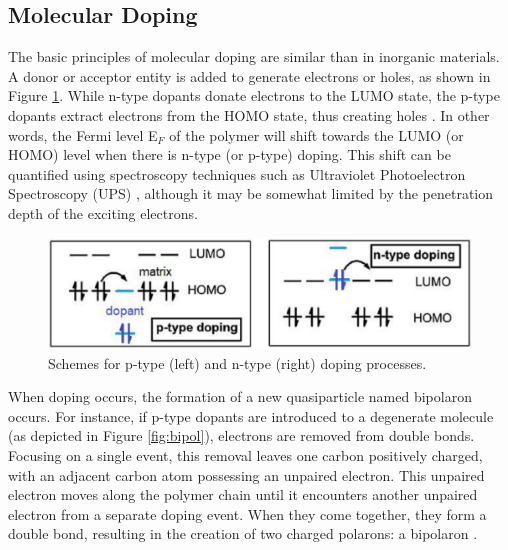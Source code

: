 
\subsection{Molecular Doping} \label{subsec:moldop}
The basic principles of molecular doping are similar than in inorganic materials. A donor or acceptor entity is added to generate electrons or holes, as shown in Figure \ref{fig:dopscheme}. While n-type dopants donate electrons to the LUMO state, the p-type dopants extract electrons from the HOMO state, thus creating holes \cite{lussemDopingOrganicSemiconductors2013}. In other words, the Fermi level E$_{F}$ of the polymer will shift towards the LUMO (or HOMO) level when there is n-type (or p-type) doping. This shift can be quantified using spectroscopy techniques such as Ultraviolet Photoelectron Spectroscopy (UPS) \cite{tietzeFermiLevelShift2012}, although it may be somewhat limited by the penetration depth of the exciting electrons.

\begin{figure}[ht]
  \centering
  \includegraphics[width=12cm]{Images/pdf/doping.pdf}
  \caption[Scheme of doping processes in organic semiconductors]{Schemes for p-type (left) and n-type (right) doping processes.}
  \label{fig:dopscheme}
\end{figure}

When doping occurs, %
the formation of a new quasiparticle named bipolaron occurs. For instance, if p-type dopants are introduced to a degenerate molecule (as depicted in Figure \ref{fig:bipol}), electrons are removed from double bonds. Focusing on a single event, this removal leaves one carbon positively charged, with an adjacent carbon atom possessing an unpaired electron. This unpaired electron moves along the polymer chain until it encounters another unpaired electron from a separate doping event. When they come together, they form a double bond, resulting in the creation of two charged polarons: a bipolaron \cite{bredasPolaronsBipolaronsSolitons1985}. %

